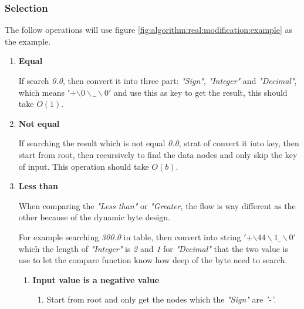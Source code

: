 \subsubsection{Selection}

The follow operations will use figure \ref{fig:algorithm:real:modification:example} as the example.

\begin{enumerate}


\item \textbf{Equal}

If search \textit{0.0}, then convert it into three part: \textit{"Sign"}, \textit{"Integer"} and \textit{"Decimal"}, which means $'$+$\backslash0\backslash\_\backslash0'$ and use this as key to get the result, this should take $O(1)$.


\item \textbf{Not equal}

If searching the result which is not equal \textit{0.0}, strat of convert it into key, then start from root, then recursively to find the data nodes and only skip the key of input. This operation should take $O(b)$.


\item \textbf{Less than}

When comparing the \emph{"Less than"} or \emph{"Greater}, the flow is way different as the other because of the dynamic byte design.

For example searching \textit{300.0} in table, then convert into string $'$+$\backslash44\backslash1\_\backslash0'$ which the length of \textit{"Integer"} is \textit{2} and \textit{1} for \textit{"Decimal"} that the two value is use to let the compare function know how deep of the byte need to search.

\begin{enumerate}

\item \textbf{Input value is a negative value}

\begin{enumerate}

\item Start from root and only get the nodes which the \textit{"Sign"} are \textit{'-'}.


\end{enumerate}
\end{enumerate}
\end{enumerate}
